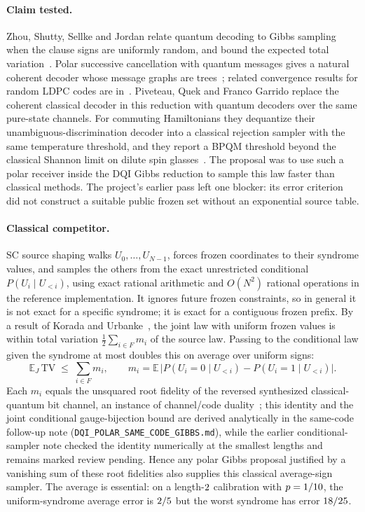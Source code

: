 \documentclass[10pt]{article}
\newcommand{\TV}{\mathrm{TV}}
\begin{document}
\paragraph{Claim tested.} Zhou, Shutty, Sellke and Jordan relate quantum decoding to Gibbs sampling when the clause signs are uniformly random, and bound the expected total variation~\cite{ZhouShuttySellkeJordan2026}. Polar successive cancellation with quantum messages gives a natural coherent decoder whose message graphs are trees~\cite{PiveteauRenes2021,MandalBrandsenPfister2024}; related convergence results for random LDPC codes are in~\cite{MandalPiveteauRenesPfister2026}. Piveteau, Quek and Franco Garrido replace the coherent classical decoder in this reduction with quantum decoders over the same pure-state channels. For commuting Hamiltonians they dequantize their unambiguous-discrimination decoder into a classical rejection sampler with the same temperature threshold, and they report a BPQM threshold beyond the classical Shannon limit on dilute spin glasses~\cite{PiveteauQuekFrancoGarrido2026}. The proposal was to use such a polar receiver inside the DQI Gibbs reduction to sample this law faster than classical methods. The project's earlier pass left one blocker: its error criterion did not construct a suitable public frozen set without an exponential source table.

\paragraph{Classical competitor.} SC source shaping walks $U_0,\ldots,U_{N-1}$, forces frozen coordinates to their syndrome values, and samples the others from the exact unrestricted conditional $P(U_i \mid U_{<i})$, using exact rational arithmetic and $O(N^2)$ rational operations in the reference implementation. It ignores future frozen constraints, so in general it is not exact for a specific syndrome; it is exact for a contiguous frozen prefix. By a result of Korada and Urbanke~\cite{KoradaUrbanke2010}, the joint law with uniform frozen values is within total variation $\tfrac12\sum_{i\in F} m_i$ of the source law. Passing to the conditional law given the syndrome at most doubles this on average over uniform signs:
\[
\mathbb{E}_J\, \TV \;\le\; \sum_{i \in F} m_i, \qquad m_i = \mathbb{E}\,\lvert P(U_i = 0 \mid U_{<i}) - P(U_i = 1 \mid U_{<i}) \rvert .
\]
Each $m_i$ equals the unsquared root fidelity of the reversed synthesized classical-quantum bit channel, an instance of channel/code duality~\cite{Renes2017,RengaswamyPfister2021}; this identity and the joint conditional gauge-bijection bound are derived analytically in the same-code follow-up note (\texttt{DQI\_POLAR\_SAME\_CODE\_GIBBS.md}), while the earlier conditional-sampler note checked the identity numerically at the smallest lengths and remains marked review pending. Hence any polar Gibbs proposal justified by a vanishing sum of these root fidelities also supplies this classical average-sign sampler. The average is essential: on a length-$2$ calibration with $p=1/10$, the uniform-syndrome average error is $2/5$ but the worst syndrome has error $18/25$.
\end{document}
